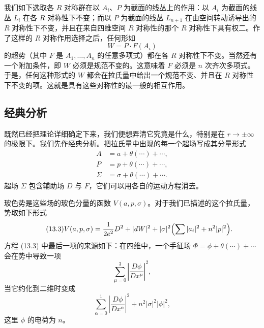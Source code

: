 
我们如下选取各 $R$ 对称群在以 $A_i$、$P$ 为截面的线丛上的作用：以 $A_i$ 为截面的线丛 $L_i$ 在各 $R$ 对称性下不变；而以 $P$ 为截面的线丛 $L_{n+1}$ 在由空间转动诱导出的 $R$ 对称性下不变，并且在来自四维空间 $R$ 对称性的那个 $R$ 对称性下具有权二。作了这样的 $R$ 对称作用选择之后，任何形如
\[
  W=P\cdot F(A_i)
\]
的超势（其中 $F$ 是 $A_1,\dots,A_n$ 的任意多项式）都在各 $R$ 对称性下不变。当然还有一个附加条件，即 $W$ 必须是规范不变的。这意味着 $F$ 必须是 $n$ 次齐次多项式。于是，任何这种形式的 $W$ 都会在拉氏量中给出一个规范不变、并且在 $R$ 对称性下不变的项。这就是具有这些对称性的最一般的相互作用。

\subsection{经典分析}

既然已经把理论详细确定下来，我们便想弄清它究竟是什么，特别是在 $r\to\pm\infty$ 的极限下。我们先作经典分析。把拉氏量中出现的每一个超场写成其分量形式
\begin{align*}
  A &= a+\theta(\cdots)+\cdots,\\
  P &= p+\theta(\cdots)+\cdots,\\
  \Sigma &= \sigma+\theta(\cdots)+\cdots.
\end{align*}
超场 $\Sigma$ 包含辅助场 $D$ 与 $F$，它们可以用各自的运动方程消去。

玻色势是这些场的玻色分量的函数 $V(a,p,\sigma)$。对于我们已描述的这个拉氏量，势取如下形式
\begin{equation}
  \tag{13.3}
  \label{eq:13-3}
  V(a,p,\sigma)=\frac{1}{2e^{2}}D^{2}+|dW|^{2}+|\sigma|^{2}\Bigl(\sum|a_i|^{2}+n^{2}|p|^{2}\Bigr).
\end{equation}
方程 (13.3) 中最后一项的来源如下：在四维中，一个手征场 $\Phi=\phi+\theta(\cdots)+\cdots$ 会在势中导致一项
\[
  \sum_{\mu=0}^{3}\left|\frac{D\phi}{Dx^{\mu}}\right|^{2},
\]
当它约化到二维时变成
\[
  \sum_{\alpha=0}^{1}\left|\frac{D\phi}{Dx^{\alpha}}\right|^{2}+n^{2}|\sigma|^{2}|\phi|^{2},
\]
这里 $\phi$ 的电荷为 $n$。


